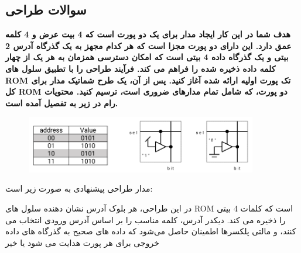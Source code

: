 \documentclass[12pt]{exam}
\begin{document}
\begin{questions}
\section{سوالات طراحی}
\question
\textbf{هدف شما در این کار ایجاد مدار برای یک  دو پورت است که 4 بیت عرض و 4 کلمه عمق دارد. این  دارای دو پورت مجزا است که هر کدام مجهز به یک گذرگاه آدرس 2 بیتی و یک گذرگاه داده 4 بیتی است که امکان دسترسی همزمان به هر یک از چهار کلمه داده ذخیره شده را فراهم می کند. فرآیند طراحی را با تطبیق سلول های ROM تک پورت اولیه ارائه شده آغاز کنید. پس از آن، یک طرح شماتیک مدار برای کل ROM دو پورت، که شامل تمام مدارهای ضروری است، ترسیم کنید. محتویات رام در زیر به تفصیل آمده است.}


\begin{figure}[h]
	\centering
	\includegraphics[width=0.9\textwidth]{images/img1}
\end{figure}

مدار طراحی پیشنهادی به صورت زیر است:


در این طراحی، هر بلوک آدرس نشان دهنده سلول های ROM است که کلمات 4 بیتی را ذخیره می کند. دیکدر آدرس، کلمه مناسب را بر اساس آدرس ورودی انتخاب می کنند، و مالتی پلکسرها اطمینان حاصل می‌شود که داده های صحیح به گذرگاه های داده خروجی برای هر پورت هدایت می شود یا خیر



\end{questions}
\end{document}
